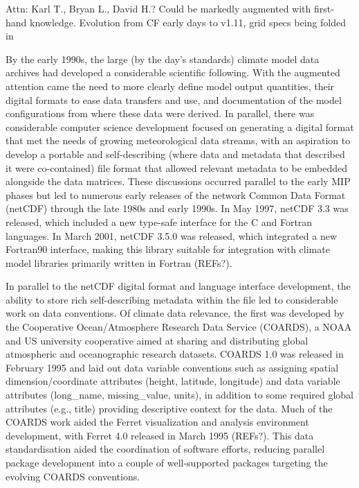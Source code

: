 \documentclass[gmd, preprint]{copernicus}
\newcommand{\mycomment}[1]{}
\def\cred#1{{\color{red}#1}}
\begin{document}
\cred{Attn: Karl T., Bryan L., David H.? Could be markedly augmented with first-hand knowledge. Evolution from CF early days to v1.11, grid specs being folded in}

By the early 1990s, the large (by the day's standards) climate model data archives had developed a considerable scientific following. With the augmented attention came the need to more clearly define model output quantities, their digital formats to ease data transfers and use, and documentation of the model configurations from where these data were derived. In parallel, there was considerable computer science development focused on generating a digital format that met the needs of growing meteorological data streams, with an aspiration to develop a portable and self-describing (where data and metadata that described it were co-contained) file format that allowed relevant metadata to be embedded alongside the data matrices. These discussions occurred parallel to the early MIP phases but led to numerous early releases of the network Common Data Format (netCDF) through the late 1980s and early 1990s. In May 1997, netCDF 3.3 was released, which included a new type-safe interface for the C and Fortran languages. In March 2001, netCDF 3.5.0 was released, which integrated a new Fortran90 interface, making this library suitable for integration with climate model libraries primarily written in Fortran \cred{(REFs?)}.
\mycomment{
https://docs.unidata.ucar.edu/nug/2.0-draft/netcdf_history.html
}

In parallel to the netCDF digital format and language interface development, the ability to store rich self-describing metadata within the file led to considerable work on data conventions. Of climate data relevance, the first was developed by the Cooperative Ocean/Atmosphere Research Data Service (COARDS), a NOAA and US university cooperative aimed at sharing and distributing global atmospheric and oceanographic research datasets. COARDS 1.0 was released in February 1995 and laid out data variable conventions such as assigning spatial dimension/coordinate attributes (height, latitude, longitude) and data variable attributes (long\_name, missing\_value, units), in addition to some required global attributes (e.g., title) providing descriptive context for the data. Much of the COARDS work aided the Ferret visualization and analysis environment development, with Ferret 4.0 released in March 1995 \cred{(REFs?)}. This data standardisation aided the coordination of software efforts, reducing parallel package development into a couple of well-supported packages targeting the evolving COARDS conventions.
\mycomment{
https://ferret.pmel.noaa.gov/Ferret/documentation/coards-netcdf-conventions
https://ferret.pmel.noaa.gov/static/Documentation/Release_Notes/v400.html
Also NCAR CSM - see http://cfconventions.org/conventions.html
}
\end{document}
